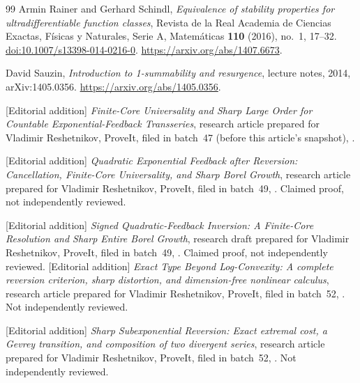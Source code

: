 \documentclass[11pt,a4paper]{article}
\numberwithin{equation}{section}
\theoremstyle{definition}
\theoremstyle{remark}
\begin{document}
\begin{thebibliography}{99}
Armin Rainer and Gerhard Schindl, \emph{Equivalence of stability
properties for ultradifferentiable function classes}, Revista de la Real
Academia de Ciencias Exactas, F\'isicas y Naturales, Serie A,
Matem\'aticas \textbf{110} (2016), no.~1, 17--32.
\href{https://doi.org/10.1007/s13398-014-0216-0}{doi:10.1007/s13398-014-0216-0}.
\url{https://arxiv.org/abs/1407.6673}.

David Sauzin, \emph{Introduction to 1-summability and resurgence},
lecture notes, 2014, arXiv:1405.0356.
\url{https://arxiv.org/abs/1405.0356}.

[Editorial addition] \emph{Finite-Core Universality and Sharp Large Order
for Countable Exponential-Feedback Transseries}, research article prepared
for Vladimir Reshetnikov, ProveIt, filed in batch~47 (before this
article's snapshot),
.

[Editorial addition] \emph{Quadratic Exponential Feedback after Reversion:
Cancellation, Finite-Core Universality, and Sharp Borel Growth}, research
article prepared for Vladimir Reshetnikov, ProveIt, filed in batch~49,
.
Claimed proof, not independently reviewed.

[Editorial addition] \emph{Signed Quadratic-Feedback Inversion: A
Finite-Core Resolution and Sharp Entire Borel Growth}, research draft
prepared for Vladimir Reshetnikov, ProveIt, filed in batch~49,
.
Claimed proof, not independently reviewed.
[Editorial addition] \emph{Exact Type Beyond Log-Convexity: A complete
reversion criterion, sharp distortion, and dimension-free nonlinear
calculus}, research article prepared for Vladimir Reshetnikov, ProveIt,
filed in batch~52,
.
Not independently reviewed.

[Editorial addition] \emph{Sharp Subexponential Reversion: Exact extremal
cost, a Gevrey transition, and composition of two divergent series},
research article prepared for Vladimir Reshetnikov, ProveIt, filed in
batch~52,
.
Not independently reviewed.
\end{thebibliography}
\end{document}

